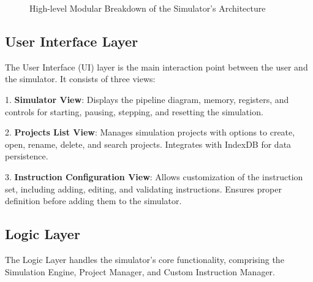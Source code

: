 \begin{figure}[H]
      \caption{High-level Modular Breakdown of the Simulator's Architecture}
    \label{fig:modular_breakdown}
\end{figure}


\subsection{User Interface Layer}
The User Interface (UI) layer is the main interaction point between the user and the simulator. It consists of three views:

1. \textbf{Simulator View}: Displays the pipeline diagram, memory, registers, and controls for starting, pausing, stepping, and resetting the simulation.

2. \textbf{Projects List View}: Manages simulation projects with options to create, open, rename, delete, and search projects. Integrates with IndexDB for data persistence.

3. \textbf{Instruction Configuration View}: Allows customization of the instruction set, including adding, editing, and validating instructions. Ensures proper definition before adding them to the simulator.

\subsection{Logic Layer}
The Logic Layer handles the simulator's core functionality, comprising the Simulation Engine, Project Manager, and Custom Instruction Manager.

